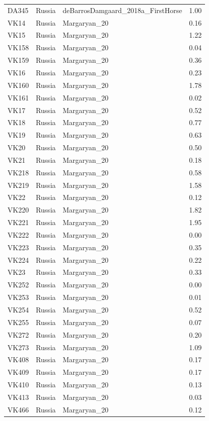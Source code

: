 \begin{longtable}[t]{lllr}
DA345 & Russia & deBarrosDamgaard\_2018a\_FirstHorse & 1.00\\
VK14 & Russia & Margaryan\_20 & 0.16\\
VK15 & Russia & Margaryan\_20 & 1.22\\
VK158 & Russia & Margaryan\_20 & 0.04\\
VK159 & Russia & Margaryan\_20 & 0.36\\
VK16 & Russia & Margaryan\_20 & 0.23\\
VK160 & Russia & Margaryan\_20 & 1.78\\
VK161 & Russia & Margaryan\_20 & 0.02\\
VK17 & Russia & Margaryan\_20 & 0.52\\
VK18 & Russia & Margaryan\_20 & 0.77\\
VK19 & Russia & Margaryan\_20 & 0.63\\
VK20 & Russia & Margaryan\_20 & 0.50\\
VK21 & Russia & Margaryan\_20 & 0.18\\
VK218 & Russia & Margaryan\_20 & 0.58\\
VK219 & Russia & Margaryan\_20 & 1.58\\
VK22 & Russia & Margaryan\_20 & 0.12\\
VK220 & Russia & Margaryan\_20 & 1.82\\
VK221 & Russia & Margaryan\_20 & 1.95\\
VK222 & Russia & Margaryan\_20 & 0.00\\
VK223 & Russia & Margaryan\_20 & 0.35\\
VK224 & Russia & Margaryan\_20 & 0.22\\
VK23 & Russia & Margaryan\_20 & 0.33\\
VK252 & Russia & Margaryan\_20 & 0.00\\
VK253 & Russia & Margaryan\_20 & 0.01\\
VK254 & Russia & Margaryan\_20 & 0.52\\
VK255 & Russia & Margaryan\_20 & 0.07\\
VK272 & Russia & Margaryan\_20 & 0.20\\
VK273 & Russia & Margaryan\_20 & 1.09\\
VK408 & Russia & Margaryan\_20 & 0.17\\
VK409 & Russia & Margaryan\_20 & 0.17\\
VK410 & Russia & Margaryan\_20 & 0.13\\
VK413 & Russia & Margaryan\_20 & 0.03\\
VK466 & Russia & Margaryan\_20 & 0.12\\

\end{longtable}
